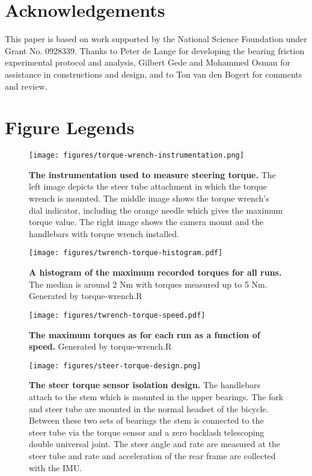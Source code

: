 \documentclass[10pt]{article}
\begin{document}
\section*{Acknowledgements}

This paper is based on work supported by the National Science Foundation under
Grant No. 0928339. Thanks to Peter de Lange for developing the bearing friction
experimental protocol and analysis, Gilbert Gede and Mohammed Osman for
assistance in constructions and design, and to Ton van den Bogert for comments
and review.




\section*{Figure Legends}

\begin{figure}[!ht]
  \centering
  \texttt{[image: figures/torque-wrench-instrumentation.png]}
  \caption{{\bf The instrumentation used to measure steering torque.}
    The left image depicts the steer tube attachment in which the torque wrench
    is mounted. The middle image shows the torque wrench's dial indicator,
    including the orange needle which gives the maximum torque value. The right
    image shows the camera mount and the handlebars with torque wrench
    installed.
    }
  \label{fig:torque-wrench-instrumentation}
\end{figure}

\begin{figure}[!ht]
  \centering
  \texttt{[image: figures/twrench-torque-histogram.pdf]}
  \caption{{\bf A histogram of the maximum recorded torques for all runs.}
    The median is around 2 Nm with torques measured up to 5 Nm. Generated by
    torque-wrench.R}
  \label{fig:twrench-torque-histogram}
\end{figure}

\begin{figure}[!ht]
  \centering
  \texttt{[image: figures/twrench-torque-speed.pdf]}
  \caption{{\bf The maximum torques as for each run as a function of speed.}
    Generated by torque-wrench.R}
  \label{fig:twrench-torque-speed}
\end{figure}

\begin{figure}[!ht]
  \centering
  \texttt{[image: figures/steer-torque-design.png]}
  \caption{{\bf The steer torque sensor isolation design.} The handlebars attach to
    the stem which is mounted in the upper bearings. The fork and steer tube
    are mounted in the normal headset of the bicycle. Between these two sets of
    bearings the stem is connected to the steer tube via the torque sensor and a
    zero backlash telescoping double universal joint. The steer angle and rate
    are measured at the steer tube and rate and acceleration of the rear frame
    are collected with the IMU.}
  \label{fig:steer-torque-design}
\end{figure}
\end{document}
